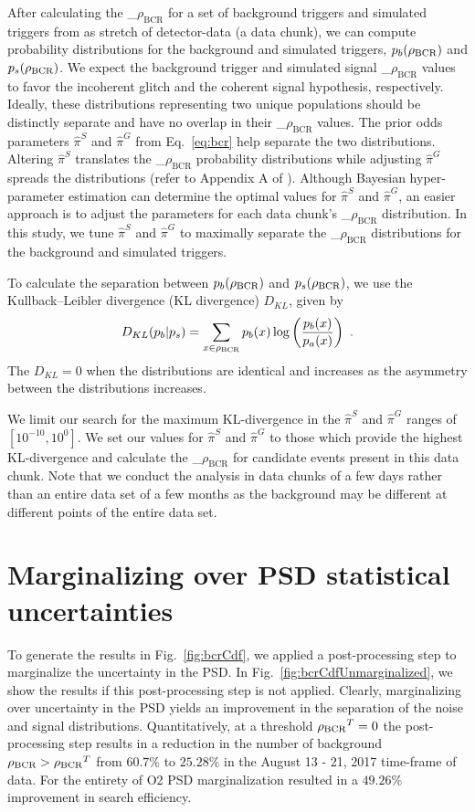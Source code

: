 \documentclass[%
 nofootinbib,
 amsmath,amssymb,
 aps,
 twocolumn,
 superscriptaddress
]{revtex4-2}
\newcommand{\mathcmd}[1]{{\sc \relax\ifmmode#1\else $#1$\fi}\xspace}
\newcommand{\bcr}{\mathcmd{\rho_\text{BCR}}}
\begin{document}
After calculating the \bcr for a set of background triggers and simulated triggers from as stretch of detector-data (a data chunk), we can compute probability distributions for the background and simulated triggers, $p_b(\bcr)$ and $p_s(\bcr)$. We expect the background trigger and simulated signal \bcr values to favor the incoherent glitch and the coherent signal hypothesis, respectively. Ideally, these distributions representing two unique populations should be distinctly separate and have no overlap in their \bcr values. The prior odds parameters $\hat{\pi}^S$ and $\hat{\pi}^G$ from Eq.~\ref{eq:bcr} help separate the two distributions. Altering $\hat{\pi}^S$ translates the \bcr probability distributions while adjusting $\hat{\pi}^G$ spreads the distributions (refer to Appendix A of \citet{BCR1}). Although Bayesian hyper-parameter estimation can determine the optimal values for $\hat{\pi}^S$ and $\hat{\pi}^G$, an easier approach is to adjust the parameters for each data chunk's \bcr distribution. In this study, we tune $\hat{\pi}^S$ and $\hat{\pi}^G$ to maximally separate the \bcr distributions for the background and simulated triggers. 

To calculate the separation between $p_b(\bcr)$ and $p_s(\bcr)$, we use the Kullback--Leibler divergence (KL divergence) $D_{KL}$, given by
\begin{equation}
    D_{KL}(p_b | p_s) = \sum\limits_{x\in \bcr} p_b(x) \log \left( \frac{p_b(x)}{p_a(x)} \right)  \ .
\end{equation}
The $D_{KL}=0$ when the distributions are identical and increases as the asymmetry between the distributions increases. 

We limit our search for the maximum KL-divergence in the $\hat{\pi}^S$ and $\hat{\pi}^G$ ranges of $[10^{-10}, 10^0]$. We set our values for $\hat{\pi}^S$ and $\hat{\pi}^G$ to those which provide the highest KL-divergence and calculate the \bcr for candidate events present in this data chunk. Note that we conduct the analysis in data chunks of a few days rather than an entire data set of a few months as the background may be different at different points of the entire data set.

\section{Marginalizing over PSD statistical uncertainties}\label{sec:psd-marginalization}
To generate the results in Fig.~\ref{fig:bcrCdf}, we applied a post-processing step to marginalize the uncertainty in the PSD. In Fig.~\ref{fig:bcrCdfUnmarginalized}, we show the results if this post-processing step is not applied. Clearly, marginalizing over uncertainty in the PSD yields an improvement in the separation of the noise and signal distributions. Quantitatively, at a threshold $\bcr^T=0$ the post-processing step results in a reduction in the number of background $\bcr > \bcr^T$ from $60.7\%$ to $25.28\%$ in the August 13 - 21, 2017 time-frame of data. For the entirety of O2 PSD marginalization resulted in a $49.26\%$ improvement in search efficiency. 
\end{document}
